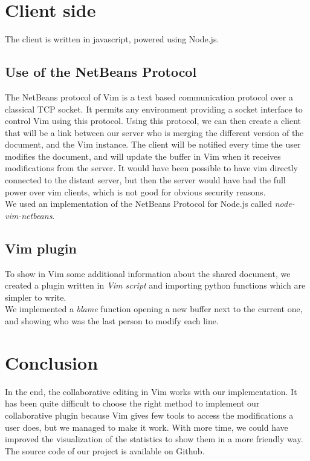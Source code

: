 \documentclass{llncs}
\begin{document}
\section{Client side}\label{sec:Others}

The client is written in javascript, powered using Node.js.\cite{nodejs}

\subsection{Use of the NetBeans Protocol}

The NetBeans protocol of Vim is a text based communication protocol over a
classical TCP socket.
It permits any environment providing a socket interface to control Vim using
this protocol.\cite{netbeans} Using this protocol, we can then create a client
that will be a link between our server who is merging the different version of
the document, and the Vim instance.
The client will be notified every time the user modifies the document, and will
update the buffer in Vim when it receives modifications from the server.
It would have been possible to have vim directly connected to the distant
server, but then the server would have had the full power over vim clients,
which is not good for obvious security reasons.\\
We used an implementation of the NetBeans Protocol for Node.js called
\textit{node-vim-netbeans}.\cite{node-vim-netbeans}

\subsection{Vim plugin}

To show in Vim some additional information about the shared document, we
created a plugin written in \textit{Vim script} and importing python functions
which are simpler to write.\\
We implemented a \textit{blame} function opening a new buffer next to the
current one, and showing who was the last person to modify each line.

\section{Conclusion}\label{sec:Conclusion}

In the end, the collaborative editing in Vim works with our implementation.
It has been quite difficult to choose the right method to implement our collaborative plugin
because Vim gives few tools to access the modifications a user does, but we managed to make it work.
With more time, we could have improved the visualization of the statistics to show them in a more friendly way.
The source code of our project is available on Github.\cite{github}
\end{document}
